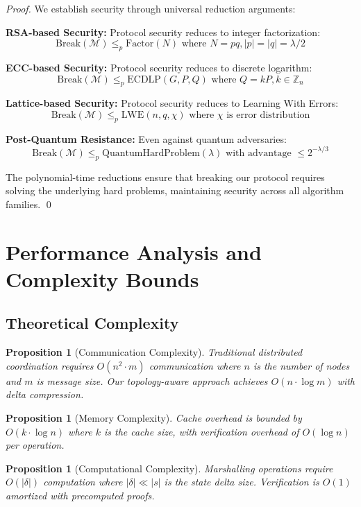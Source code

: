 \documentclass[11pt,a4paper]{article}
\newtheorem{proposition}[theorem]{Proposition}
\theoremstyle{definition}
\theoremstyle{remark}
\newcommand{\M}{\mathcal{M}}
\begin{document}
\begin{proof}
We establish security through universal reduction arguments:

\textbf{RSA-based Security:} Protocol security reduces to integer factorization:
$$\text{Break}(\M) \leq_p \text{Factor}(N) \text{ where } N = pq, |p| = |q| = \lambda/2$$

\textbf{ECC-based Security:} Protocol security reduces to discrete logarithm:
$$\text{Break}(\M) \leq_p \text{ECDLP}(G, P, Q) \text{ where } Q = kP, k \in \mathbb{Z}_n$$

\textbf{Lattice-based Security:} Protocol security reduces to Learning With Errors:
$$\text{Break}(\M) \leq_p \text{LWE}(n, q, \chi) \text{ where } \chi \text{ is error distribution}$$

\textbf{Post-Quantum Resistance:} Even against quantum adversaries:
$$\text{Break}(\M) \leq_p \text{QuantumHardProblem}(\lambda) \text{ with advantage } \leq 2^{-\lambda/3}$$

The polynomial-time reductions ensure that breaking our protocol requires solving the underlying hard problems, maintaining security across all algorithm families. \qed
\end{proof}

\section{Performance Analysis and Complexity Bounds}

\subsection{Theoretical Complexity}

\begin{proposition}[Communication Complexity]
Traditional distributed coordination requires $O(n^2 \cdot m)$ communication where $n$ is the number of nodes and $m$ is message size. Our topology-aware approach achieves $O(n \cdot \log m)$ with delta compression.
\end{proposition}

\begin{proposition}[Memory Complexity]
Cache overhead is bounded by $O(k \cdot \log n)$ where $k$ is the cache size, with verification overhead of $O(\log n)$ per operation.
\end{proposition}

\begin{proposition}[Computational Complexity]
Marshalling operations require $O(|\delta|)$ computation where $|\delta| \ll |s|$ is the state delta size. Verification is $O(1)$ amortized with precomputed proofs.
\end{proposition}
\end{document}
